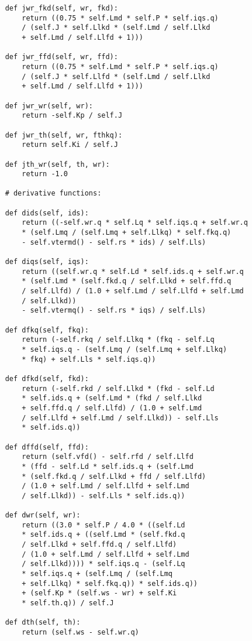 \begin{lstlisting}
    def jwr_fkd(self, wr, fkd):
        return ((0.75 * self.Lmd * self.P * self.iqs.q)
        / (self.J * self.Llkd * (self.Lmd / self.Llkd
        + self.Lmd / self.Llfd + 1)))
        
    def jwr_ffd(self, wr, ffd):
        return ((0.75 * self.Lmd * self.P * self.iqs.q)
        / (self.J * self.Llfd * (self.Lmd / self.Llkd
        + self.Lmd / self.Llfd + 1)))
        
    def jwr_wr(self, wr):
        return -self.Kp / self.J
        
    def jwr_th(self, wr, fthkq):
        return self.Ki / self.J
        
    def jth_wr(self, th, wr):
        return -1.0
        
    # derivative functions:
        
    def dids(self, ids):
        return ((-self.wr.q * self.Lq * self.iqs.q + self.wr.q
        * (self.Lmq / (self.Lmq + self.Llkq) * self.fkq.q)
        - self.vtermd() - self.rs * ids) / self.Lls)
        
    def diqs(self, iqs):
        return ((self.wr.q * self.Ld * self.ids.q + self.wr.q
        * (self.Lmd * (self.fkd.q / self.Llkd + self.ffd.q
        / self.Llfd) / (1.0 + self.Lmd / self.Llfd + self.Lmd
        / self.Llkd))
        - self.vtermq() - self.rs * iqs) / self.Lls)
        
    def dfkq(self, fkq):
        return (-self.rkq / self.Llkq * (fkq - self.Lq
        * self.iqs.q - (self.Lmq / (self.Lmq + self.Llkq)
        * fkq) + self.Lls * self.iqs.q))
        
    def dfkd(self, fkd):
        return (-self.rkd / self.Llkd * (fkd - self.Ld
        * self.ids.q + (self.Lmd * (fkd / self.Llkd
        + self.ffd.q / self.Llfd) / (1.0 + self.Lmd
        / self.Llfd + self.Lmd / self.Llkd)) - self.Lls
        * self.ids.q))
        
    def dffd(self, ffd):
        return (self.vfd() - self.rfd / self.Llfd
        * (ffd - self.Ld * self.ids.q + (self.Lmd
        * (self.fkd.q / self.Llkd + ffd / self.Llfd)
        / (1.0 + self.Lmd / self.Llfd + self.Lmd
        / self.Llkd)) - self.Lls * self.ids.q))
        
    def dwr(self, wr):
        return ((3.0 * self.P / 4.0 * ((self.Ld
        * self.ids.q + ((self.Lmd * (self.fkd.q
        / self.Llkd + self.ffd.q / self.Llfd)
        / (1.0 + self.Lmd / self.Llfd + self.Lmd
        / self.Llkd)))) * self.iqs.q - (self.Lq
        * self.iqs.q + (self.Lmq / (self.Lmq
        + self.Llkq) * self.fkq.q)) * self.ids.q))
        + (self.Kp * (self.ws - wr) + self.Ki
        * self.th.q)) / self.J
        
    def dth(self, th):
        return (self.ws - self.wr.q)
\end{lstlisting}

